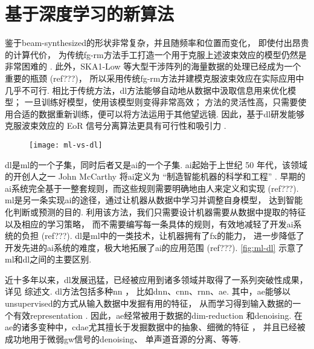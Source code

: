 \section{基于深度学习的新算法}

鉴于\ac{beam-synthesized}的形状非常复杂，并且随频率和位置而变化，
即使付出昂贵的计算代价，
为传统\ac{fg-rm}方法手工打造一个用于克服上述波束效应的模型仍然是非常困难的
\cite{lochner2015}.
此外，SKA1-Low 等大型干涉阵列的海量数据的处理已经成为一个重要的瓶颈 (ref???)，
所以采用传统\ac{fg-rm}方法并建模克服波束效应在实际应用中几乎不可行.
相比于传统方法，\ac{dl}方法能够自动地从数据中汲取信息用来优化模型；
一旦训练好模型，使用该模型则变得非常高效；
方法的灵活性高，只需要使用合适的数据重新训练，便可以将方法运用于其他望远镜.
因此，基于\ac{dl}研发能够克服波束效应的 EoR 信号分离算法更具有可行性和吸引力
\cite{herbel2018,vafaeiSadr2019}.

\begin{figure}[htp]
  \centering
  \texttt{[image: ml-vs-dl]}
  \label{fig:ml-dl}
\end{figure}

\ac{dl}是\ac{ml}的一个子集，同时后者又是\ac{ai}的一个子集.
\ac{ai}起始于上世纪 50 年代，该领域的开创人之一 John McCarthy 将\ac{ai}定义为
\enquote{制造智能机器的科学和工程} \cite{mcCarthy2007}.
早期的\ac{ai}系统完全基于一整套规则，而这些规则需要明确地由人来定义和实现 (ref???).
\ac{ml}是另一条实现\ac{ai}的途径，通过让机器从数据中学习并调整自身模型，
达到智能化判断或预测的目的.
利用该方法，我们只需要设计机器需要从数据中提取的特征以及相应的学习策略，
而不需要编写每一条具体的规则，有效地减轻了开发\ac{ai}系统的负担 (ref???).
\ac{dl}是\ac{ml}中的一类技术，让机器拥有了\ac{fx}的能力，
进一步降低了开发先进的\ac{ai}系统的难度，极大地拓展了\ac{ai}的应用范围 (ref???).
\autoref{fig:ml-dl} 示意了\ac{ml}和\ac{dl}之间的主要区别.

近十多年以来，\ac{dl}发展迅猛，已经被应用到诸多领域并取得了一系列突破性成果，
详见  综述文.
\ac{dl}方法包括多种\ac{nn} \cite{bengio2009,leCun2015,schmidhuber2015}，
比如\ac{dnn}、\ac{cnn}、\ac{rnn}、\ac{ae}.
其中，\ac{ae}能够以\ac{unsupervised}的方式从输入数据中发掘有用的特征，
从而学习得到输入数据的一个有效\ac{representation} \cite{bourlard1988}.
因此，\ac{ae}经常被用于数据的\ac{dim-reduction}\cite{hinton2006,wang2014}
和\ac{denoising}\cite{xie2012,lu2013,bengio2013}.
在\ac{ae}的诸多变种中，\ac{cdae}尤其擅长于发掘数据中的抽象、细微的特征 \cite{du2017}，
并且已经被成功地用于微弱\ac{gw}信号的\ac{denoising}\cite{shen2017}、
单声道音源的分离\cite{grais2017}、等等.

